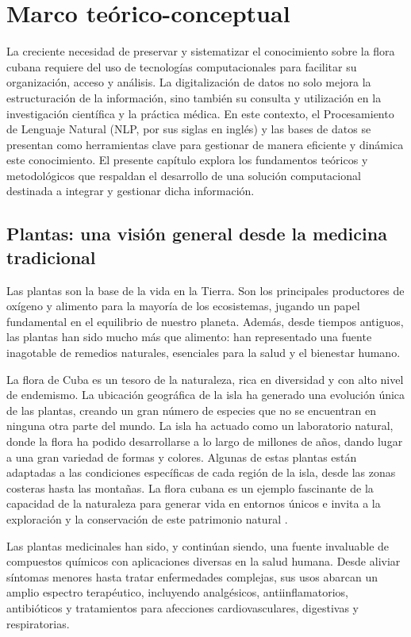 \chapter{Marco te\'orico-conceptual}\label{chater: teoricalChapter}

La creciente necesidad de preservar y sistematizar el conocimiento sobre la flora cubana 
requiere  del uso de tecnologías computacionales para facilitar su organización, 
acceso y análisis. La digitalización de datos no solo mejora la estructuración 
de la información, sino también su consulta y utilización en la investigación científica 
y la práctica médica. En este contexto, el Procesamiento de Lenguaje Natural (NLP, por sus siglas en inglés) 
y las bases de datos se presentan como herramientas clave para gestionar de manera eficiente 
y dinámica este conocimiento. El presente capítulo explora los fundamentos teóricos 
y metodológicos que respaldan el desarrollo de una solución computacional destinada a integrar 
y gestionar dicha información.

\section{Plantas: una visión general desde la medicina tradicional}
Las plantas son la base de la vida en la Tierra. Son los principales productores de oxígeno 
y alimento para la mayoría de los ecosistemas, jugando un papel fundamental en el equilibrio 
de nuestro planeta. Además, desde tiempos antiguos, las plantas han sido mucho más que 
alimento: han representado una fuente inagotable de remedios naturales, esenciales para la 
salud y el bienestar humano.

La flora de Cuba es un tesoro de la naturaleza, rica en diversidad y con alto nivel de 
endemismo. La ubicación geográfica de la isla ha generado una evolución única de las plantas, 
creando un gran número de especies que no se encuentran en ninguna otra parte del mundo. 
La isla ha actuado como un laboratorio natural, donde la flora ha podido desarrollarse a lo 
largo de millones de años, dando lugar a una gran variedad de formas y colores. Algunas de 
estas plantas están adaptadas a las condiciones específicas de cada región de la isla, desde 
las zonas costeras hasta las montañas. La flora cubana es un ejemplo fascinante de la 
capacidad de la naturaleza para generar vida en entornos únicos e invita a la exploración y 
la conservación de este patrimonio natural \cite{Pocs1988}.

Las plantas medicinales han sido, y continúan siendo, una fuente invaluable de compuestos 
químicos con aplicaciones diversas en la salud humana. Desde aliviar síntomas menores hasta 
tratar enfermedades complejas, sus usos abarcan un amplio espectro terapéutico, 
incluyendo analgésicos, antiinflamatorios, antibióticos y tratamientos para afecciones 
cardiovasculares, digestivas y respiratorias.

